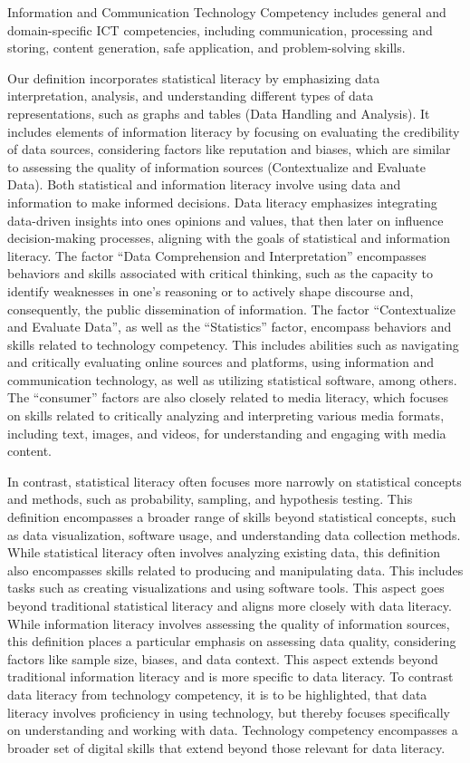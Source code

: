 \documentclass[
  12pt,
  a4paper,
  twoside]{article}
\begin{document}
Information and Communication Technology Competency includes general and
domain-specific ICT competencies, including communication, processing
and storing, content generation, safe application, and problem-solving
skills.

Our definition incorporates statistical literacy by emphasizing data
interpretation, analysis, and understanding different types of data
representations, such as graphs and tables (Data Handling and Analysis).
It includes elements of information literacy by focusing on evaluating
the credibility of data sources, considering factors like reputation and
biases, which are similar to assessing the quality of information
sources (Contextualize and Evaluate Data). Both statistical and
information literacy involve using data and information to make informed
decisions. Data literacy emphasizes integrating data-driven insights
into ones opinions and values, that then later on influence
decision-making processes, aligning with the goals of statistical and
information literacy. The factor ``Data Comprehension and
Interpretation'' encompasses behaviors and skills associated with
critical thinking, such as the capacity to identify weaknesses in one's
reasoning or to actively shape discourse and, consequently, the public
dissemination of information. The factor ``Contextualize and Evaluate
Data'', as well as the ``Statistics'' factor, encompass behaviors and
skills related to technology competency. This includes abilities such as
navigating and critically evaluating online sources and platforms, using
information and communication technology, as well as utilizing
statistical software, among others. The ``consumer'' factors are also
closely related to media literacy, which focuses on skills related to
critically analyzing and interpreting various media formats, including
text, images, and videos, for understanding and engaging with media
content.

In contrast, statistical literacy often focuses more narrowly on
statistical concepts and methods, such as probability, sampling, and
hypothesis testing. This definition encompasses a broader range of
skills beyond statistical concepts, such as data visualization, software
usage, and understanding data collection methods. While statistical
literacy often involves analyzing existing data, this definition also
encompasses skills related to producing and manipulating data. This
includes tasks such as creating visualizations and using software tools.
This aspect goes beyond traditional statistical literacy and aligns more
closely with data literacy. While information literacy involves
assessing the quality of information sources, this definition places a
particular emphasis on assessing data quality, considering factors like
sample size, biases, and data context. This aspect extends beyond
traditional information literacy and is more specific to data literacy.
To contrast data literacy from technology competency, it is to be
highlighted, that data literacy involves proficiency in using
technology, but thereby focuses specifically on understanding and
working with data. Technology competency encompasses a broader set of
digital skills that extend beyond those relevant for data literacy.
\end{document}
